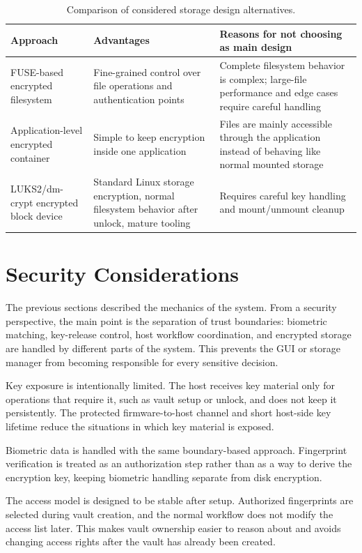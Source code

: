 \begin{table}[!htbp]
\centering
\caption{\label{tab:design-alternatives}Comparison of considered storage design alternatives.}
\begin{tabularx}{\textwidth}{lXX}
\toprule
Approach & Advantages & Reasons for not choosing as main design\\
\midrule
FUSE-based encrypted filesystem & Fine-grained control over file operations and authentication points & Complete filesystem behavior is complex; large-file performance and edge cases require careful handling\\
Application-level encrypted container & Simple to keep encryption inside one application & Files are mainly accessible through the application instead of behaving like normal mounted storage\\
LUKS2/dm-crypt encrypted block device & Standard Linux storage encryption, normal filesystem behavior after unlock, mature tooling & Requires careful key handling and mount/unmount cleanup\\
\bottomrule
\end{tabularx}
\end{table}

\section{Security Considerations}

The previous sections described the mechanics of the system. From a security perspective, the main point is the separation of trust boundaries: biometric matching, key-release control, host workflow coordination, and encrypted storage are handled by different parts of the system. This prevents the GUI or storage manager from becoming responsible for every sensitive decision.

Key exposure is intentionally limited. The host receives key material only for operations that require it, such as vault setup or unlock, and does not keep it persistently. The protected firmware-to-host channel and short host-side key lifetime reduce the situations in which key material is exposed.

Biometric data is handled with the same boundary-based approach. Fingerprint verification is treated as an authorization step rather than as a way to derive the encryption key, keeping biometric handling separate from disk encryption.

The access model is designed to be stable after setup. Authorized fingerprints are selected during vault creation, and the normal workflow does not modify the access list later. This makes vault ownership easier to reason about and avoids changing access rights after the vault has already been created.

